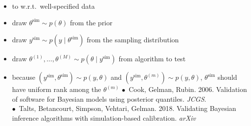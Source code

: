 \documentclass[10pt]{report}
\newcommand{\draw}[2]{#1^{(#2)}}
\newcommand{\simvar}[1]{#1^{\textrm{sim}}}
\begin{document}
\begin{itemize}
\item to  w.r.t.\ well-specified data
  \item draw $\simvar{\theta} \sim p(\theta)$ from the prior
  \item draw $\simvar{y} \sim p(y \mid \simvar{\theta})$ from the
    sampling distribution
  \item draw $\draw{\theta}{1}, \ldots, \draw{\theta}{M} \sim p(\theta
    \mid \simvar{y})$ from algorithm to test
  \item because $(\simvar{y}, \simvar{\theta}) \sim p(y, \theta)$ and
    $(\simvar{y}, \draw{\theta}{m}) \sim p(y, \theta)$,
    $\simvar{\theta}$ should have uniform rank among the
    $\draw{\theta}{m}$
    \vfill
    {\tiny $\bullet$\ Cook,  Gelman, Rubin.
      2006. Validation of software for Bayesian models using posterior
      quantiles. \textit{JCGS}.
      \\
      $\bullet$\ Talts, Betancourt, Simpson, Vehtari, Gelman. 2018. Validating Bayesian inference algorithms with simulation-based calibration. \textit{arXiv}}
\end{itemize}
\end{document}
